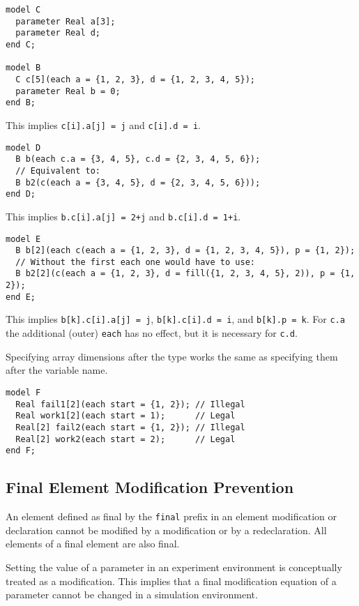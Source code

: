 \begin{example}
\begin{lstlisting}[language=modelica]
model C
  parameter Real a[3];
  parameter Real d;
end C;

model B
  C c[5](each a = {1, 2, 3}, d = {1, 2, 3, 4, 5});
  parameter Real b = 0;
end B;
\end{lstlisting}
This implies \lstinline!c[i].a[j] = j! and \lstinline!c[i].d = i!.

\begin{lstlisting}[language=modelica]
model D
  B b(each c.a = {3, 4, 5}, c.d = {2, 3, 4, 5, 6});
  // Equivalent to:
  B b2(c(each a = {3, 4, 5}, d = {2, 3, 4, 5, 6}));
end D;
\end{lstlisting}
This implies \lstinline!b.c[i].a[j] = 2+j! and \lstinline!b.c[i].d = 1+i!.
\begin{lstlisting}[language=modelica]
model E
  B b[2](each c(each a = {1, 2, 3}, d = {1, 2, 3, 4, 5}), p = {1, 2});
  // Without the first each one would have to use:
  B b2[2](c(each a = {1, 2, 3}, d = fill({1, 2, 3, 4, 5}, 2)), p = {1, 2});
end E;
\end{lstlisting}
This implies \lstinline!b[k].c[i].a[j] = j!, \lstinline!b[k].c[i].d = i!, and \lstinline!b[k].p = k!.
For \lstinline!c.a! the additional (outer) \lstinline!each! has no effect, but it is necessary for \lstinline!c.d!.

Specifying array dimensions after the type works the same as specifying them after the variable name.
\begin{lstlisting}[language=modelica]
model F
  Real fail1[2](each start = {1, 2}); // Illegal
  Real work1[2](each start = 1);      // Legal
  Real[2] fail2(each start = {1, 2}); // Illegal
  Real[2] work2(each start = 2);      // Legal
end F;
\end{lstlisting}
\end{example}


\subsection{Final Element Modification Prevention}\label{final-element-modification-prevention}

An element defined as final by the \lstinline!final! prefix in an element modification or declaration cannot be modified by a modification or by a redeclaration.
All elements of a final element are also final.

\begin{nonnormative}
Setting the value of a parameter in an experiment environment is conceptually treated as a modification.
This implies that a final modification equation of a parameter cannot be changed in a simulation environment.
\end{nonnormative}

